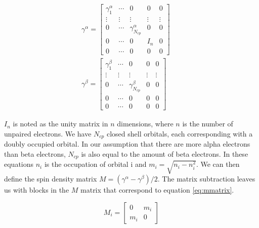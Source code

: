 \documentclass[twoside,twocolumn,9pt]{article}
\begin{document}
\begin{subequations}
  \begin{align}
    \label{eq:gammaafull}
    \gamma^\alpha = \begin{bmatrix}
      \gamma^\alpha_1 & \cdots & 0                      & 0      & 0      \\
      \vdots          & \vdots & \vdots                 & \vdots & \vdots \\
      0               & \cdots & \gamma^\alpha_{N_{cp}} & 0      & 0      \\
      0               & \cdots & 0                      & I_n    & 0      \\
      0               & \cdots & 0                      & 0      & 0
    \end{bmatrix} &  & \\
    \label{eq:gammabfull}
    \gamma^\beta = \begin{bmatrix}
      \gamma^\beta_1 & \cdots & 0                     & 0      & 0      \\
      \vdots         & \vdots & \vdots                & \vdots & \vdots \\
      0              & \cdots & \gamma^\beta_{N_{cp}} & 0      & 0      \\
      0              & \cdots & 0                     & 0      & 0      \\
      0              & \cdots & 0                     & 0      & 0
    \end{bmatrix}  &  &
  \end{align}
\end{subequations}

$I_n$ is noted as the unity matrix in $n$ dimensions, where $n$ is the number of unpaired electrons. We have $N_{cp}$ closed shell orbitals, each corresponding with a doubly occupied
orbital. In our assumption that there are more alpha electrons than beta electrons, $N_{cp}$ is also equal to the amount of beta electrons.
In these equations $n_i$ is the occupation of orbital i and $m_i = \sqrt{n_i - n_i^2}$\cite{Scuseria2010}. We can then define the spin density matrix
$M = (\gamma^\alpha - \gamma^\beta)/2$. The matrix subtraction leaves us with blocks in the $M$ matrix that correspond to equation \eqref{eq:mmatrix}.

\begin{equation}\label{eq:mmatrix}
  M_i = \begin{bmatrix}
    0   & m_i \\
    m_i & 0
  \end{bmatrix}
\end{equation}
\end{document}
